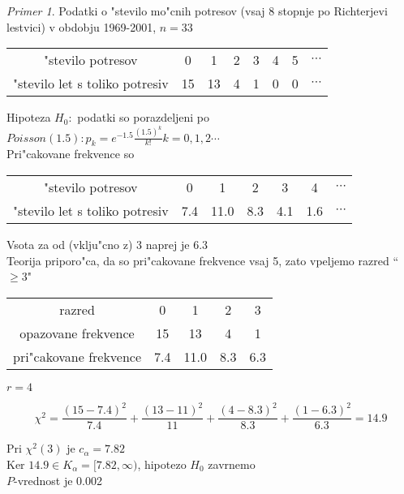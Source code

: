 \documentclass[a4paper,12pt]{article}
\theoremstyle{definition}
\theoremstyle{remark}
\newtheorem*{ex}{Primer}
\begin{document}
\begin{ex}
    Podatki o "stevilo mo"cnih potresov (vsaj 8 stopnje po Richterjevi lestvici) v obdobju 1969-2001, $n=33$

    \begin{center}
        \begin{tabular}{c c c c c c c c}
            "stevilo potresov & 0 & 1 & 2 & 3 & 4 & 5 & $\cdots$ \\
            "stevilo let s toliko potresiv & 15 & 13 & 4 & 1 & 0 & 0 & $\cdots$
        \end{tabular}
    \end{center}

    Hipoteza $H_0:$ podatki so porazdeljeni po $Poisson(1.5): p_k = e^{-1.5} \frac{(1.5)^k}{k!} k = 0, 1, 2 \cdots$ \\
    Pri"cakovane frekvence so

    \begin{center}
        \begin{tabular}{c c c c c c c}
            "stevilo potresov & 0 & 1 & 2 & 3 & 4 & $\cdots$ \\
            "stevilo let s toliko potresiv & 7.4 & 11.0 & 8.3 & 4.1 & 1.6 & $\cdots$
        \end{tabular}
    \end{center}

    Vsota za od (vklju"cno z) 3 naprej je 6.3 \\
    Teorija priporo"ca, da so pri"cakovane frekvence vsaj 5, zato vpeljemo razred ``$\geq 3$"

    \begin{center}
        \begin{tabular}{c c c c c}
            razred & 0 & 1 & 2 & 3 \\
            opazovane frekvence & 15 & 13 & 4 & 1 \\
            pri"cakovane frekvence & 7.4 & 11.0 & 8.3 & 6.3
        \end{tabular}
    \end{center}

    $r=4$

    \begin{equation*}
        \chi^2 = \frac{(15-7.4)^2}{7.4} + \frac{(13-11)^2}{11} + \frac{(4-8.3)^2}{8.3} + \frac{(1-6.3)^2}{6.3} = 14.9
    \end{equation*}

    Pri $\chi^2(3)$ je $c_{\alpha} = 7.82$ \\
    Ker $14.9 \in K_{\alpha} = [7.82, \infty)$, hipotezo $H_0$ zavrnemo \\
    $P$-vrednost je 0.002
\end{ex}
\end{document}
